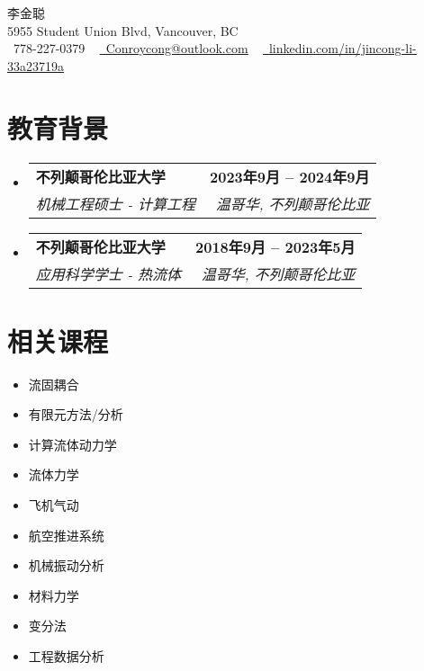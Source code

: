 \documentclass[letterpaper,11pt]{article}
\makeatletter
\newcommand{\resumeSubheading}[4]{
  \vspace{-2pt}\item
    \begin{tabular*}{1.0\textwidth}[t]{l@{\extracolsep{\fill}}r}
      \textbf{#1} & \textbf{\small #2} \\
      \textit{\small#3} & \textit{\small #4} \\
    \end{tabular*}\vspace{-7pt}
}
\newcommand{\resumeSubHeadingListStart}{\begin{itemize}[leftmargin=0.0in, label={}]}
\newcommand{\resumeSubHeadingListEnd}{\end{itemize}}
\makeatother
\begin{document}
\begin{center}
    {\Huge \scshape 李金聪} \\ \vspace{1pt}
    5955 Student Union Blvd, Vancouver, BC \\ \vspace{1pt}
    \small \raisebox{-0.1\height}\faPhone\ 778-227-0379 ~ \href{mailto:x@gmail.com}{\raisebox{-0.2\height}\faEnvelope\  \underline{Conroycong@outlook.com}} ~ 
    \href{https://linkedin.com/in/jincong-li-33a23719a/}{\raisebox{-0.2\height}\faLinkedin\ \underline{linkedin.com/in/jincong-li-33a23719a}}  ~
    \vspace{-8pt}
\end{center}

\section{教育背景}
  \resumeSubHeadingListStart
    \resumeSubheading
      {不列颠哥伦比亚大学}{2023年9月 -- 2024年9月}
      {机械工程硕士 - 计算工程}{温哥华, 不列颠哥伦比亚}
    \resumeSubheading
      {不列颠哥伦比亚大学}{2018年9月 -- 2023年5月}
      {应用科学学士 - 热流体}{温哥华, 不列颠哥伦比亚}
  \resumeSubHeadingListEnd

\section{相关课程}
        \begin{multicols}{4}
            \begin{itemize}[itemsep=-5pt, parsep=3pt]
                \item 流固耦合
                \item 有限元方法/分析
                \item 计算流体动力学
                \item 流体力学
                \item 飞机气动
                \item 航空推进系统
                \item 机械振动分析
                \item 材料力学
                \item 变分法
                \item 工程数据分析
            \end{itemize}
        \end{multicols}
        \vspace*{2.0\multicolsep}
\end{document}
